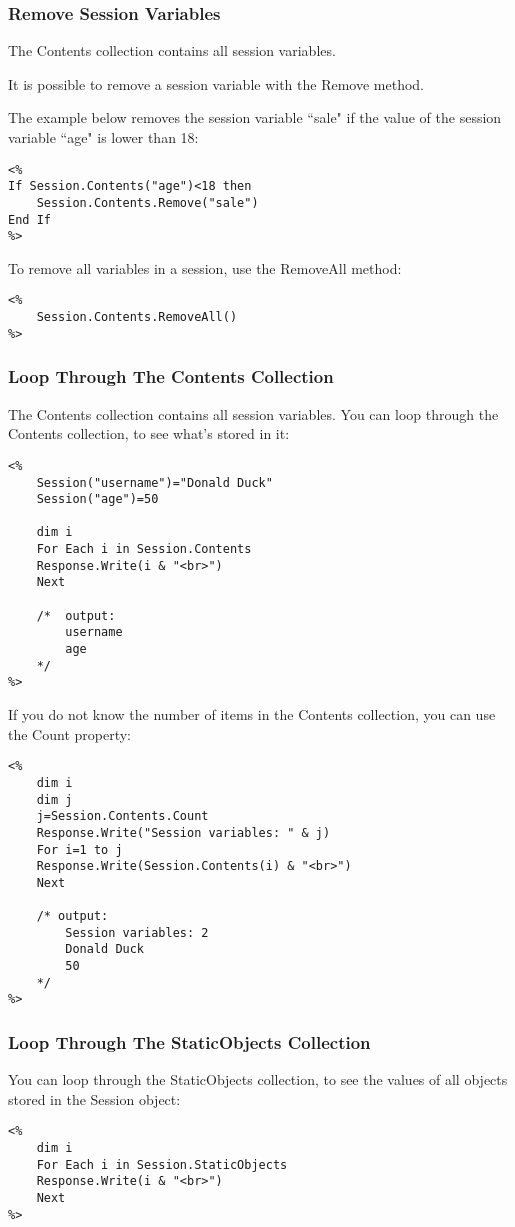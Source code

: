\subsubsection*{Remove Session Variables }
The Contents collection contains all session variables.

It is possible to remove a session variable with the Remove method.

The example below removes the session variable ``sale" if the value of the session variable ``age" is lower than 18: 
\begin{lstlisting}
<%
If Session.Contents("age")<18 then
	Session.Contents.Remove("sale")
End If
%>
\end{lstlisting}

To remove all variables in a session, use the RemoveAll method: 
\begin{lstlisting}
<%
	Session.Contents.RemoveAll()
%>
\end{lstlisting}

\subsubsection*{Loop Through The Contents Collection}
The Contents collection contains all session variables. You can loop through the Contents collection, to see what's stored in it:
\begin{lstlisting}
<%
	Session("username")="Donald Duck"
	Session("age")=50
	
	dim i
	For Each i in Session.Contents
	Response.Write(i & "<br>")
	Next
	
	/*  output: 
		username
		age 
	*/
%>
\end{lstlisting}
If you do not know the number of items in the Contents collection, you can use the Count property:
\begin{lstlisting}
<%
	dim i
	dim j
	j=Session.Contents.Count
	Response.Write("Session variables: " & j)
	For i=1 to j
	Response.Write(Session.Contents(i) & "<br>")
	Next
	
	/* output:
		Session variables: 2
		Donald Duck
		50
	*/	
%>
\end{lstlisting}

\subsubsection*{Loop Through The StaticObjects Collection}
You can loop through the StaticObjects collection, to see the values of all objects stored in the Session object:
\begin{lstlisting}
<%
	dim i
	For Each i in Session.StaticObjects
	Response.Write(i & "<br>")
	Next
%>
\end{lstlisting}
